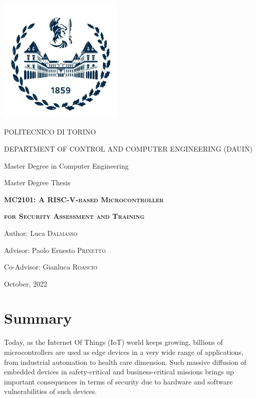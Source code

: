 \documentclass[%
    formato=a4paper,
    corpo=11pt,
    twoside,
    stile=standard,
    tipotesi=magistrale,
    evenboxes,
    english
]{toptesi}
\begin{document}
\english
{} %

\begin{titlepage}
\centerline{
\includegraphics[width=6cm]{politologonuovo.jpeg}} 
\vspace{1cm}
\centerline{\huge POLITECNICO DI TORINO}
\vspace{0.5cm}
\centerline{\Large DEPARTMENT OF CONTROL AND COMPUTER ENGINEERING (DAUIN)}
\vspace{1.5cm}
\centerline{\Large Master Degree in Computer Engineering}
\vspace{1cm}
\centerline{\LARGE Master Degree Thesis}
\vspace{1.5cm}
\centerline{\huge\textsc{\bfseries MC2101: A RISC-V-based Microcontroller}}
\vspace{0.3cm}
\centerline{\huge\textsc{\bfseries for Security Assessment and Training}}
\vspace{1.5cm}
\centerline{\Large Author: Luca \textsc{Dalmasso}}
\vspace{1.1cm}
\centerline{\Large Advisor: Paolo Ernesto \textsc{Prinetto}}
\vspace{0.3cm}
\centerline{\Large Co-Advisor: Gianluca \textsc{Roascio}}
\vspace{1cm}
\centerline{\LARGE October, 2022}
\end{titlepage}

\section*{Summary}
Today, as the Internet Of Things (IoT) world keeps growing, billions of microcontrollers are used as edge devices in a very wide range of applications, from industrial automation to health care dimension.
Such massive diffusion of embedded devices in safety-critical and business-critical missions brings up important consequences in terms of security due to hardware and software vulnerabilities of such devices.
\end{document}
